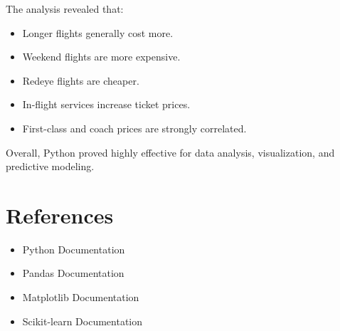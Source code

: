 \documentclass[12pt,a4paper]{article}
\begin{document}
The analysis revealed that:

\begin{itemize}
    \item Longer flights generally cost more.
    \item Weekend flights are more expensive.
    \item Redeye flights are cheaper.
    \item In-flight services increase ticket prices.
    \item First-class and coach prices are strongly correlated.
\end{itemize}

Overall, Python proved highly effective for data analysis, visualization, and predictive modeling.

\section{References}

\begin{itemize}
    \item Python Documentation
    \item Pandas Documentation
    \item Matplotlib Documentation
    \item Scikit-learn Documentation
\end{itemize}
\end{document}
